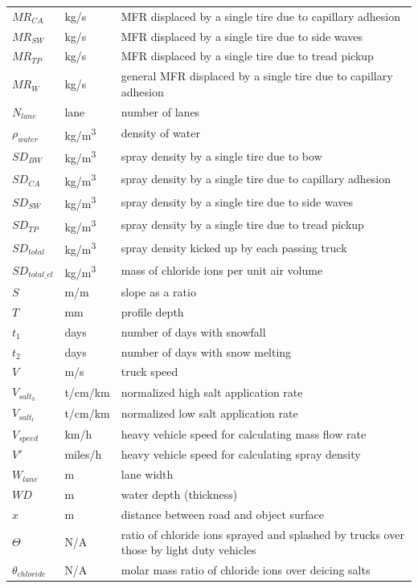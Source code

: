 \documentclass[12pt]{article}
\begin{document}
\begin{longtable*}{l l p{12cm}}
$\mathit{MR_{CA}}$ & \si{kg/s} & MFR displaced by a single tire due to capillary adhesion\\
$\mathit{MR_{SW}}$ & \si{kg/s} & MFR displaced by a single tire due to side waves\\
$\mathit{MR_{TP}}$ & \si{kg/s} & MFR displaced by a single tire due to tread pickup\\
$\mathit{MR_{W}}$ & \si{kg/s} & general MFR displaced by a single tire due to capillary adhesion\\
$N_{lane}$ & lane & number of lanes\\
$\rho_{water}$ & \si{kg/m^{3}} & density of water\\
$\mathit{SD_{BW}}$ & \si{kg/m^{3}} & spray density by a single tire due to bow\\
$\mathit{SD_{CA}}$ & \si{kg/m^{3}} & spray density by a single tire due to capillary adhesion\\
$\mathit{SD_{SW}}$ & \si{kg/m^{3}} & spray density by a single tire due to side waves\\
$\mathit{SD_{TP}}$ & \si{kg/m^{3}} & spray density by a single tire due to tread pickup\\
$\mathit{SD_{total}}$ & \si{kg/m^{3}} & spray density kicked up by each passing truck\\
$\mathit{SD_{total\_cl}}$ & \si{kg/m^3} & mass of chloride ions per unit air volume\\
$S$ & \si{m/m} & slope as a ratio\\
$T$ & \si{mm} & profile depth\\
$t_1$ & days & number of days with snowfall\\
$t_2$ & days & number of days with snow melting\\
$V$ & \si{m/s} & truck speed\\
$V_{salt_{h}}$ & \si{t/cm/km} & normalized high salt application rate\\
$V_{salt_{l}}$ & \si{t/cm/km} & normalized low salt application rate\\
$V_{speed}$ & \si{km/h} & heavy vehicle speed for calculating mass flow rate\\
$V'$ & \si{miles/h} & heavy vehicle speed for calculating spray density\\ %
$W_{lane}$ & \si{m} & lane width\\
$\mathit{WD}$ & \si{m} & water depth (thickness)\\
$x$ & \si{m} & distance between road and object surface\\
$\Theta$ & N/A & ratio of chloride ions sprayed and splashed by trucks over those by light duty vehicles\\
$\theta_{chloride}$ & N/A & molar mass ratio of chloride ions over deicing salts\\
\bottomrule
\end{longtable*}
\end{document}
